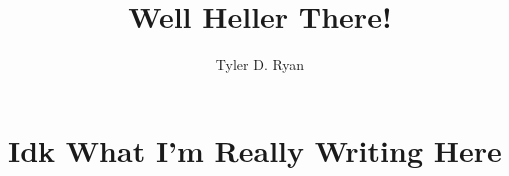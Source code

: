 \documentclass{article}
\begin{document}
\title{Well Heller There!}
\author{Tyler D. Ryan}
\maketitle
\newpage

\section{Idk What I'm Really Writing Here}
\blindmathtrue
\blindtext
\blindtext
\end{document}
